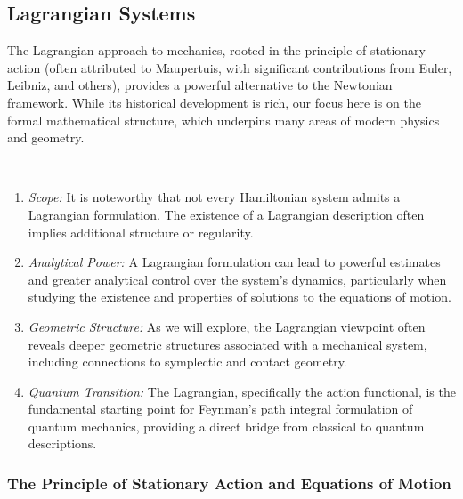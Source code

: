 \subsection{Lagrangian Systems}

The Lagrangian approach to mechanics, rooted in the principle of stationary action (often attributed to Maupertuis, with significant contributions from Euler, Leibniz, and others), provides a powerful alternative to the Newtonian framework. While its historical development is rich, our focus here is on the formal mathematical structure, which underpins many areas of modern physics and geometry.

\begin{remark}
\label{rem:lagrangian_advantages}
\,
\begin{enumerate}
    \item \textit{Scope:} It is noteworthy that not every Hamiltonian system admits a Lagrangian formulation. The existence of a Lagrangian description often implies additional structure or regularity.
    \item \textit{Analytical Power:} A Lagrangian formulation can lead to powerful estimates and greater analytical control over the system's dynamics, particularly when studying the existence and properties of solutions to the equations of motion.
    \item \textit{Geometric Structure:} As we will explore, the Lagrangian viewpoint often reveals deeper geometric structures associated with a mechanical system, including connections to symplectic and contact geometry.
    \item \textit{Quantum Transition:} The Lagrangian, specifically the action functional, is the fundamental starting point for Feynman's path integral formulation of quantum mechanics, providing a direct bridge from classical to quantum descriptions.
\end{enumerate}
\end{remark}

\subsubsection{The Principle of Stationary Action and Equations of Motion}

